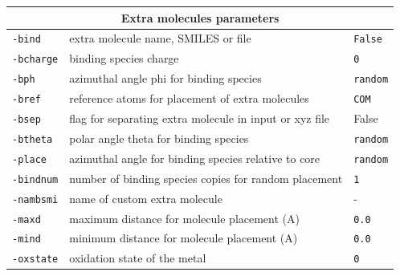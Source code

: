 \documentclass[a4paper,12pt]{assignment}
\begin{document}
\begin{tabular}{|l|l|l|}
\hline
\multicolumn{3}{|c|}{\Large \textbf{Extra molecules parameters}}\\ \hline
\texttt{-bind} & extra molecule name, SMILES or file & \texttt{False} \\
\texttt{-bcharge} & binding species charge & \texttt{0} \\
\texttt{-bph} & azimuthal angle phi for binding species & \texttt{random} \\
\texttt{-bref} & reference atoms for placement of extra molecules &  \texttt{COM}  \\
\texttt{-bsep} & flag for separating extra molecule in input or xyz file & False \\
\texttt{-btheta} & polar angle theta for binding species & \texttt{random} \\
\texttt{-place} & azimuthal angle for binding species relative to core & \texttt{random} \\
\texttt{-bindnum} & number of binding species copies for random placement & \texttt{1} \\
\texttt{-nambsmi} & name of custom extra molecule & - \\
\texttt{-maxd} & maximum distance for molecule placement (A) & \texttt{0.0} \\
\texttt{-mind} & minimum distance for molecule placement (A) & \texttt{0.0} \\
\texttt{-oxstate} &  oxidation state of the metal & \texttt{0} \\
\hline
\end{tabular}
\end{document}
